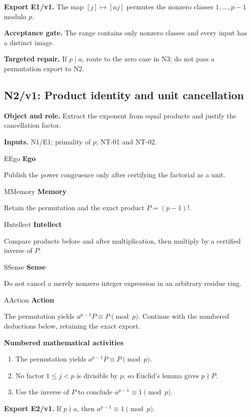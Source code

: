 \documentclass[preprint,12pt,aps,pra,showkeys,amsmath,amssymb,superscriptaddress,floatfix]{revtex4-2}
\theoremstyle{definition}
\theoremstyle{remark}
\newcommand{\mmfaculty}[3]{%
 \begin{mmfacultybox}{#1}{#2}
 {\sffamily\bfseries\color{MMBlue}#2}\par\smallskip #3
 \end{mmfacultybox}}
\newcommand{\field}[2]{\par\smallskip\noindent\textbf{#1.} #2\par}
\begin{document}
\field{Export E1/v1}{The map \([j]\mapsto[aj]\) permutes the nonzero classes \(1,\ldots,p-1\)
modulo \(p\).}

\field{Acceptance gate}{The range contains only nonzero classes and every input has a distinct
image.}

\field{Targeted repair}{If \(p\mid a\), route to the zero case in N3; do not pass a permutation
export to N2.}

\clearpage

\subsection{N2/v1: Product identity and unit cancellation}

\field{Object and role}{Extract the exponent from equal products and justify the cancellation
factor.}

\field{Inputs}{N1/E1; primality of \(p\); NT-01 and NT-02.}

\mmfaculty{E}{Ego}{Publish the power congruence only after certifying the factorial as a
unit.}

\mmfaculty{M}{Memory}{Retain the permutation and the exact product \(P=(p-1)!\).}

\mmfaculty{I}{Intellect}{Compare products before and after multiplication, then multiply by a
certified inverse of \(P\).}

\mmfaculty{S}{Sense}{Do not cancel a merely nonzero integer expression in an arbitrary
residue ring.}

\mmfaculty{A}{Action}{The permutation yields \(a^{p-1}P\equiv P\pmod p\). Continue with the
numbered deductions below, retaining the exact export.}

\smallskip\noindent\textbf{Numbered mathematical activities}

\begin{enumerate}[label=N2.\arabic*,leftmargin=3.4em]

\item The permutation yields \(a^{p-1}P\equiv P\pmod p\).

\item No factor \(1\le j<p\) is divisible by \(p\), so Euclid's lemma gives
\(p\nmid P\).

\item Use the inverse of \(P\) to conclude \(a^{p-1}\equiv1\pmod p\).

\end{enumerate}

\field{Export E2/v1}{If \(p\nmid a\), then \(a^{p-1}\equiv1\pmod p\).}
\end{document}
